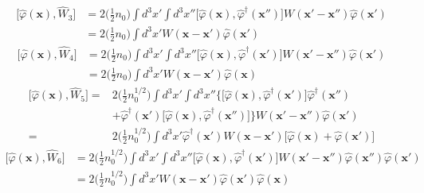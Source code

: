 \documentclass[12pt]{article}
\begin{document}
\begin{equation}
    \begin{split}
        \big[\hat{\varphi}(\mathbf{x}),\hat{W}_3\big]&=2\Big(\frac{1}{2}n_0\Big)
        \int d^3x'\int d^3x''\big[\hat{\varphi}(\mathbf{x}),\hat{\varphi}^\dagger
        (\mathbf{x}'')\big]W(\mathbf{x}'-\mathbf{x}'')\hat{\varphi}(\mathbf{x}')\\
        &=2\Big(\frac{1}{2}n_0\Big)\int d^3x'W(\mathbf{x}-\mathbf{x}')\hat{\varphi}
        (\mathbf{x}')
    \end{split}
\end{equation}
\begin{equation}
    \begin{split}
        \big[\hat{\varphi}(\mathbf{x}),\hat{W}_4\big]&=2\Big(\frac{1}{2}n_0\Big)
        \int d^3x'\int d^3x''\big[\hat{\varphi}(\mathbf{x}),\hat{\varphi}^\dagger
        (\mathbf{x}')\big]W(\mathbf{x}'-\mathbf{x}'')\hat{\varphi}(\mathbf{x}')\\
        &=2\Big(\frac{1}{2}n_0\Big)\int d^3x'W(\mathbf{x}-\mathbf{x}')\hat{\varphi}
        (\mathbf{x})
    \end{split}
\end{equation}
\begin{equation}
    \begin{split}
        \big[\hat{\varphi}(\mathbf{x}),\hat{W}_5\big]=&2\Big(\frac{1}{2}n_0^{1/2}\Big)
        \int d^3x'\int d^3x''\big\{\big[\hat{\varphi}(\mathbf{x}),\hat{\varphi}
        ^\dagger(\mathbf{x}')\big]\hat{\varphi}^\dagger(\mathbf{x}'')\\
        &+\hat{\varphi}^\dagger(\mathbf{x}')\big[\hat{\varphi}(\mathbf{x}),
        \hat{\varphi}^\dagger(\mathbf{x}'')\big]\big\}W(\mathbf{x}'-\mathbf{x}'')
        \hat{\varphi}(\mathbf{x}')\\
        =&2\Big(\frac{1}{2}n_0^{1/2}\Big)\int d^3x'\hat{\varphi}^\dagger(\mathbf{x}')
        W(\mathbf{x}-\mathbf{x}')\big[\hat{\varphi}(\mathbf{x})+\hat{\varphi}
        (\mathbf{x}')\big]
    \end{split}
\end{equation}
\begin{equation}
    \begin{split}
        \big[\hat{\varphi}(\mathbf{x}),\hat{W}_6\big]&=2\Big(\frac{1}{2}n_0^{1/2}\Big)
        \int d^3x'\int d^3x''\big[\hat{\varphi}(\mathbf{x}),\hat{\varphi}^\dagger
        (\mathbf{x}')\big]W(\mathbf{x}'-\mathbf{x}'')\hat{\varphi}(\mathbf{x}'')
        \hat{\varphi}(\mathbf{x}')\\
        &=2\Big(\frac{1}{2}n_0^{1/2}\Big)\int d^3x'W(\mathbf{x}-\mathbf{x}')
        \hat{\varphi}(\mathbf{x}')\hat{\varphi}(\mathbf{x})
    \end{split}
\end{equation}
\end{document}
